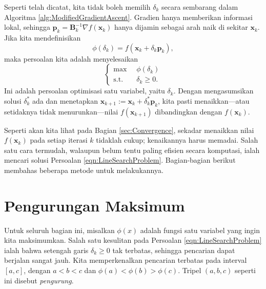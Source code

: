 \begin{remark} Seperti telah dicatat, kita tidak boleh memilih $\delta_k$ secara sembarang dalam Algoritma \ref{alg:ModifiedGradientAscent}. Gradien hanya memberikan informasi lokal, sehingga $\mathbf{p}_k = \mathbf{B}_k^{-1} \nabla f(\mathbf{x}_k)$ hanya dijamin sebagai arah naik di sekitar $\mathbf{x}_k$. Jika kita mendefinisikan
\begin{equation}
\phi(\delta_k) = f(\mathbf{x}_k + \delta_k \mathbf{p}_k),
\end{equation}
maka persoalan kita adalah menyelesaikan
\begin{equation}
\left\{
\begin{aligned}
\max \;\; &\phi(\delta_k)\\
\text{s.t.} \;\; & \delta_k \geq 0.
\end{aligned}\right.
\label{eqn:LineSearchProblem}
\end{equation}
Ini adalah persoalan optimisasi satu variabel, yaitu $\delta_k$. Dengan mengasumsikan solusi $\delta_k^*$ ada dan menetapkan $\mathbf{x}_{k+1}:=\mathbf{x}_k+\delta_k^*\mathbf{p}_k$, kita pasti menaikkan---atau setidaknya tidak menurunkan---nilai $f(\mathbf{x}_{k+1})$ dibandingkan dengan $f(\mathbf{x}_k)$.
\end{remark}

\begin{remark} Seperti akan kita lihat pada Bagian \ref{sec:Convergence}, sekadar menaikkan nilai $f(\mathbf{x}_k)$ pada setiap iterasi $k$ tidaklah cukup; kenaikannya harus memadai. Salah satu cara termudah, walaupun belum tentu paling efisien secara komputasi, ialah mencari solusi Persoalan \ref{eqn:LineSearchProblem}. Bagian-bagian berikut membahas beberapa metode untuk melakukannya.
\end{remark}

\section{Pengurungan Maksimum}
\begin{remark} Untuk seluruh bagian ini, misalkan $\phi(x)$ adalah fungsi satu variabel yang ingin kita maksimumkan. Salah satu kesulitan pada Persoalan \ref{eqn:LineSearchProblem} ialah bahwa setengah garis $\delta_k\geq0$ tak terbatas, sehingga pencarian dapat berjalan sangat jauh. Kita memperkenalkan pencarian terbatas pada interval $[a,c]$, dengan $a<b<c$ dan $\phi(a)<\phi(b)>\phi(c)$. Tripel $(a,b,c)$ seperti ini disebut \textit{pengurung}.
\end{remark}

